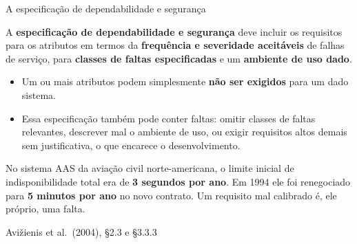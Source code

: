 \documentclass{beamer}
\newcommand{\sect}[1]{\par\smallskip\hfill{\tiny\color{black!55}Avi\v{z}ienis et al.\ (2004), #1}}
\begin{document}
\begin{frame}{A especifica\c{c}\~ao de dependabilidade e seguran\c{c}a}
    \footnotesize
    \begin{defi}
        \scriptsize
        A \textbf{especifica\c{c}\~ao de dependabilidade e seguran\c{c}a} deve incluir os requisitos para os atributos em termos da \textbf{frequ\^encia e severidade aceit\'aveis} de falhas de servi\c{c}o, para \textbf{classes de faltas especificadas} e um \textbf{ambiente de uso dado}.
    \end{defi}
    \medskip
    \begin{itemize}
        \item Um ou mais atributos podem simplesmente \textbf{n\~ao ser exigidos} para um dado sistema.
        \item Essa especifica\c{c}\~ao tamb\'em pode conter faltas: omitir classes de faltas relevantes, descrever mal o ambiente de uso, ou exigir requisitos altos demais sem justificativa, o que encarece o desenvolvimento.
    \end{itemize}
    \medskip
    \begin{pratica}
        \scriptsize
        No sistema AAS da avia\c{c}\~ao civil norte-americana, o limite inicial de indisponibilidade total era de \textbf{3 segundos por ano}. Em 1994 ele foi renegociado para \textbf{5 minutos por ano} no novo contrato. Um requisito mal calibrado \'e, ele pr\'oprio, uma falta.
    \end{pratica}
    \sect{\S2.3 e \S3.3.3}
\end{frame}
\end{document}
